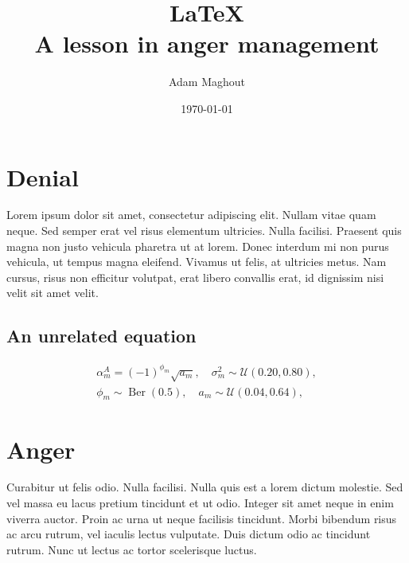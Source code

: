 \documentclass[10pt, fullpage, a4paper, titlepage]{article}
\title{{\myfont LaTeX \\ \Large A lesson in anger management}}
\author{Adam Maghout}
\date{\today}
\begin{document}
\maketitle

\tableofcontents

\newpage

\section{Denial}

Lorem ipsum dolor sit amet, consectetur adipiscing elit. Nullam vitae quam neque. Sed semper erat vel risus elementum ultricies. Nulla facilisi. Praesent quis magna non justo vehicula pharetra ut at lorem. Donec interdum mi non purus vehicula, ut tempus magna eleifend. Vivamus ut felis, at ultricies metus. Nam cursus, risus non efficitur volutpat, erat libero convallis erat, id dignissim nisi velit sit amet velit.

\subsection{An unrelated equation}

\begin{equation}
\begin{gathered}
\alpha_m^A=(-1)^{\phi_m} \sqrt{a_m}, \quad \sigma_m^2 \sim \mathcal{U}(0.20,0.80), \\
\phi_m \sim \operatorname{Ber}(0.5), \quad a_m \sim \mathcal{U}(0.04,0.64),
\end{gathered}
\end{equation}

\section{Anger}

Curabitur ut felis odio. Nulla facilisi. Nulla quis est a lorem dictum molestie. Sed vel massa eu lacus pretium tincidunt et ut odio. Integer sit amet neque in enim viverra auctor. Proin ac urna ut neque facilisis tincidunt. Morbi bibendum risus ac arcu rutrum, vel iaculis lectus vulputate. Duis dictum odio ac tincidunt rutrum. Nunc ut lectus ac tortor scelerisque luctus.
\end{document}

